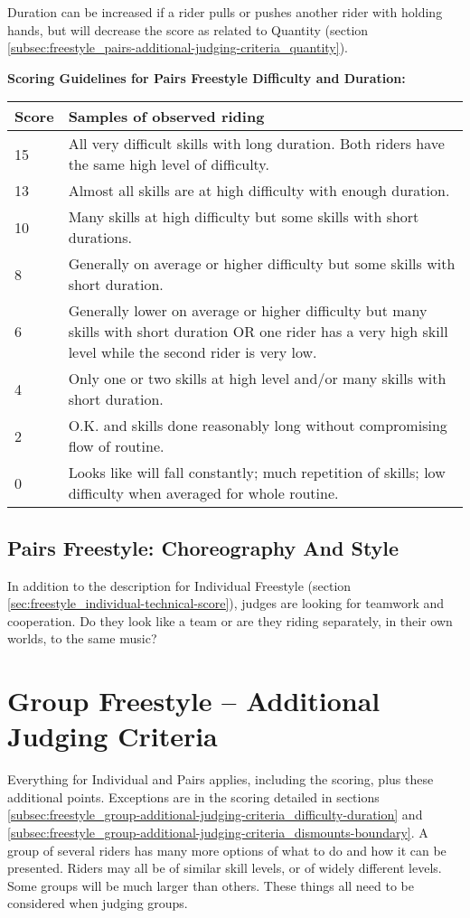 Duration can be increased if a rider pulls or pushes another rider with holding hands, but will decrease the score as related to Quantity (section \ref{subsec:freestyle_pairs-additional-judging-criteria_quantity}).

\textbf{Scoring Guidelines for Pairs Freestyle Difficulty and Duration:}

\begin{tabular}{|l|p{12.5cm}|}
\hline
\textbf{Score} & \textbf{Samples of observed riding} \\
\hline 
15 & All very difficult skills with long duration. Both riders have the same high level of difficulty. \\
\hline
13 & Almost all skills are at high difficulty with enough duration. \\
\hline
10 & Many skills at high difficulty but some skills with short durations. \\
\hline
8 & Generally on average or higher difficulty but some skills with short duration. \\
\hline
6 & Generally lower on average or higher difficulty but many skills with short duration OR one rider has a very high skill level while the second rider is very low. \\
\hline
4 & Only one or two skills at high level and/or many skills with short duration. \\
\hline
2 & O.K. and skills done reasonably long without compromising flow of routine. \\
\hline
0 & Looks like will fall constantly; much repetition of skills; low difficulty when averaged for whole routine. \\
\hline
\end{tabular}

\subsection{Pairs Freestyle: Choreography And Style}
In addition to the description for Individual Freestyle (section \ref{sec:freestyle_individual-technical-score}), judges are looking for teamwork and cooperation.
Do they look like a team or are they riding separately, in their own worlds, to the same music?

\section{Group Freestyle – Additional Judging Criteria}
Everything for Individual and Pairs applies, including the scoring, plus these additional points.
Exceptions are in the scoring detailed in sections \ref{subsec:freestyle_group-additional-judging-criteria_difficulty-duration} and \ref{subsec:freestyle_group-additional-judging-criteria_dismounts-boundary}.
A group of several riders has many more options of what to do and how it can be presented.
Riders may all be of similar skill levels, or of widely different levels.
Some groups will be much larger than others.
These things all need to be considered when judging groups.

